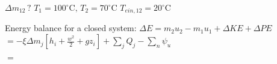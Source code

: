 \( \Delta m_{12} \, ? \)  
\( T_1 = 100^\circ \text{C}, \, T_2 = 70^\circ \text{C} \)  
\( T_{ein,12} = 20^\circ \text{C} \)  

Energy balance for a closed system:  
\( \Delta E = m_2 u_2 - m_1 u_1 + \Delta KE + \Delta PE \)  
\( = -\xi \Delta m_j \left[ h_i + \frac{w^2}{2} + g z_i \right] + \sum_j Q_j - \sum_n \psi_u \)  

\( = \)